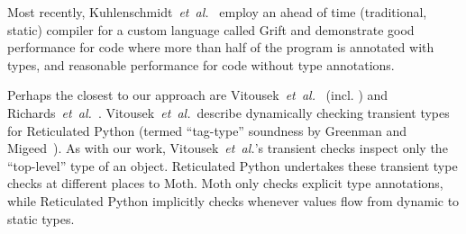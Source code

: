 Most recently, Kuhlenschmidt~\textit{et~al.}~\cite{Kuhlenschmidt:2018:preprint} employ an
ahead of time (\ie traditional, static) compiler for a custom
language called Grift and demonstrate good performance for code where more than
half of the program is annotated with types, and reasonable
performance for code without type annotations.

\label{reticRW}
Perhaps the closest to our approach are
Vitousek~\textit{et~al.}~\cite{reticPython2014} (incl. \citep{Vitousek2017,Greenman2018})
and Richards~\textit{et~al.}~\cite{Richards2017}.
Vitousek~\textit{et~al.}~describe dynamically checking transient types
for Reticulated Python (termed ``tag-type'' soundness by Greenman
and Migeed~\cite{Greenman2018}).
As with our work, Vitousek~\textit{et~al.}'s transient checks inspect
only the ``top-level'' type of an
object.
%
%
Reticulated Python undertakes these transient type checks at different
places to Moth.  Moth only checks explicit type annotations, while
Reticulated Python implicitly checks whenever values flow from dynamic
to static types.
%
%
